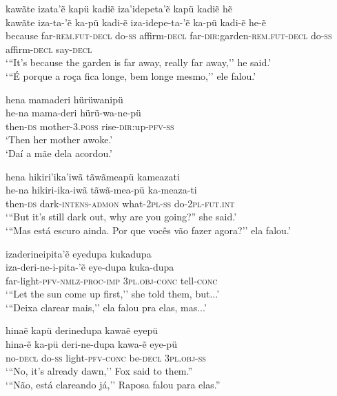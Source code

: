 \documentclass[output=paper,
modfonts,nonflat
]{langsci/langscibook}
\begin{document}
\largerpage
\ea   kawãte izata'ẽ kapü kadiẽ iza'idepeta'ẽ kapü kadiẽ hẽ \\[.3em]
\gll kawãte iza-ta-'ẽ ka-pü kadi-ẽ iza-idepe-ta-'ẽ ka-pü kadi-ẽ he-ẽ \\
because far-\textsc{rem.fut-decl} do-\textsc{ss} affirm-\textsc{decl} far-\textsc{dir:}garden-\textsc{rem.fut-decl} do-\textsc{ss} affirm-\textsc{decl} say-\textsc{decl}\\
\glt    `{``}It's because the garden is far away, really far away,'' he said.' \\
`{``}É porque a roça fica longe, bem longe mesmo,'' ele falou.'  \\
\z

 
\ea   hena mamaderi hürüwanipü \\[.3em]
\gll 	he-na mama-deri hürü-wa-ne-pü\\
then-\textsc{ds} mother-\textsc{3.poss} rise-\textsc{dir:}up-\textsc{pfv-ss}\\
\glt `Then her mother awoke.' \\
`Daí a mãe dela acordou.' \\
\z

\ea   hena hikiri'ika'iwã tãwãmeapü kameazati \\[.3em]
\gll  he-na hikiri-ika-iwã tãwã-mea-pü ka-meaza-ti \\
then-\textsc{ds} dark-\textsc{intens-admon} what-\textsc{2pl-ss} do-\textsc{2pl-fut.int}\\
\glt    `{``}But it's still dark out, why are you going?{''} she said.' \\
 `{``}Mas está escuro ainda. Por que vocês vão fazer agora?'' ela falou.'
\z

\ea   izaderineipita'ẽ eyedupa kukadupa \\[.3em]
\gll iza-deri-ne-i-pita-'ẽ eye-dupa kuka-dupa\\
far-light-\textsc{pfv-nmlz-proc-imp} \textsc{3pl.obj-conc} tell-\textsc{conc}\\
\glt    `{``}Let the sun come up first,'' she told them, but...' \\
 `{``}Deixa clarear mais,'' ela falou pra elas, mas...'\\
\z


\ea   hinaẽ kapü derinedupa kawaẽ eyepü \\[.3em]
\gll  hina-ẽ ka-pü deri-ne-dupa kawa-ẽ eye-pü\\
no-\textsc{decl} do-\textsc{ss} light-\textsc{pfv-conc} be-\textsc{decl} \textsc{3pl.obj-ss}\\
\glt    `{``}No, it's already dawn,'' Fox said to them.'' \\
 `{``}Não, está clareando já,'' Raposa falou para elas.''
\z
\end{document}
